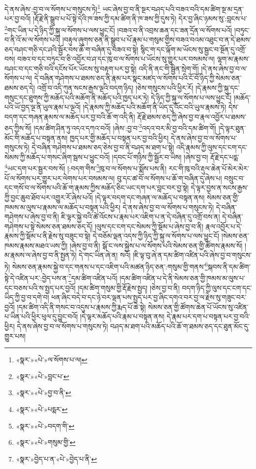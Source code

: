 དེ་ནས་ཞེས་:བྱ་བ་ལ་སོགས་པ་གསུངས་ཏེ།\footnote{«སྣར་»«པེ་»ལ་སོགས་པ་ལ།} ཡང་ཞེས་བྱ་བ་ནི་སྔར་བཤད་པའི་བཟའ་བའི་དམ་ཚིག་སྔ་མ་དྲན་པར་བྱ་བའོ། །རྡོ་རྗེ་ནི་སྒྲུབ་པ་པོ་སྟེ་དེའི་ཁ་ཟས་ཀྱི་དམ་ཚིག་ནི་ཁ་ཟས་ཀྱི་དུས་ཏེ། དེར་བྱ་ཞིང་ཉམས་སུ་:བླངས་པ་\footnote{«སྣར་»«པེ་»བླང་པ་}གང་ཡིན་པ་དེ་ཉིད་ཀྱི་སྐུ་ལ་སོགས་པ་ལས་ཕྱུང་ངོ། །བཟའ་བ་ནི་འབྲས་ཆན་དང་ཟན་དྲོན་ལ་སོགས་པའོ། །བཏུང་བ་ནི་འོ་མ་ལ་སོགས་པའོ། །བརྟུལ་ཞུགས་ཅན་ནི་སྒྲུབ་པ་པོ་རྣམ་པ་གསུམ་གྱིས་བཟའ་བའམ་འཐུང་བ་ན་དེ་ཐམས་ཅད་བཤང་གཅི་དང་ཤའི་སྦྱོར་བས་ཆོ་ག་བཞིན་དུ་བཟའ་བ་སྟེ། སྙིང་ག་དང་ལྐོག་མ་ཡོངས་སུ་སྦྱང་བ་སྔོན་དུ་འགྲོ་བས། བཟའ་བ་དང་བཏུང་བ་ཅི་འབྱོར་བ་ཤ་དང་ཁུ་བ་ལ་སོགས་པ་ཡོངས་སུ་གྱུར་པར་བསམས་ལ། ལྷག་མ་རྣམས་བཤང་བ་དང་གཅི་བའི་དངོས་པོར་ཡོངས་སུ་བརྟག་པར་བྱ་སྟེ། འདི་ནི་ནང་གི་སྦྱིན་སྲེག་གོ། །དེ་ནས་ཞེས་བྱ་བ་ལ་སོགས་པ་ལ། དེ་བཞིན་གཤེགས་པ་ཐམས་ཅད་ནི་རྣམ་པར་སྣང་མཛད་ལ་སོགས་པའི་ངོ་བོ་ཉིད་ཀྱི་སེམས་ཅན་ཐམས་ཅད་དེ། འགྲོ་བ་འདི་ཀུན་སངས་རྒྱས་ལྔའི་བདག་ཉིད། །ཅེས་གསུངས་པའི་ཕྱིར་རོ། །དེ་རྣམས་ཀྱི་སྐུ་དང་གསུང་དང་ཐུགས་ཀྱི་མཆོད་པའི་མཆོག་ནི་མཆོད་པའི་ཁྱད་པར་ཏེ། དེ་ཉིད་ཀྱི་སྐུ་ལ་སོགས་པ་ལས་ཕྱུང་ངོ། །མཆོད་པའི་ཡོ་བྱད་ལྔ་ནི་ཡུལ་རྣམ་པ་ལྔའོ། །དེ་རྣམས་ཀྱི་མཆོད་པའི་མཆོག་ནི་ཡིད་དུ་འོང་བའི་ཡུལ་རྣམས་ཏེ། དེས་བདག་དང་གཞན་རྣམས་ལ་མཆོད་པར་བྱ་བའི་ཆོ་ག་འདི་ནི། རྡོ་རྗེ་ཐམས་ཅད་ཀྱི་ཞེས་བྱ་བ་རྣལ་འབྱོར་པ་ཐམས་ཅད་ཀྱིས་སོ། །དམ་ཚིག་ཤིན་ཏུ་འདའ་དཀའ་བའོ། །ཞེས་:བྱ་བ་\footnote{«སྣར་»«པེ་»བྱ་བ་ནི་}འདའ་བར་མི་བྱ་བའི་དམ་ཚིག་གོ། །དེ་ལྟར་ཐུན་མོང་གི་མཆོད་པ་བསྟན་ནས། ཁྱད་པར་གྱི་མཆོད་པ་བསྟན་པར་བྱ་བའི་ཕྱིར། དེ་ནས་ཞེས་བྱ་བ་ལ་སོགས་པ་གསུངས་ཏེ། དེ་བཞིན་གཤེགས་པ་ཐམས་ཅད་ཅེས་བྱ་བ་ནི་བཤད་མ་ཐག་པ་སྟེ། འདི་རྣམས་ཀྱི་ལུས་དང་ངག་དང་སེམས་ཀྱི་མཆོད་པ་གསང་ཞིག་སྦས་པ་ཕྱུང་བའོ། །དབང་པོ་གཉིས་ཀྱི་སྦྱོར་བ་ཡིས། །ཞེས་བྱ་བ། རྡོ་རྗེ་དང་པདྨ་\footnote{«སྣར་»«པེ་»པདྨར་}ཡང་དག་པར་སྦྱར་བས་སོ། །:བདག་གིས་\footnote{«སྣར་»«པེ་»བདག་གི་}ཁུ་བ་ལ་སོགས་པ་སྨོས་པས་ནི། རང་གི་ཁུ་བའི་རྡུལ་ཆེན་པོ་མེར་མེར་པོ་ལ་སོགས་པར་གྱུར་པར་ལེགས་པར་བསམས་ལ། བུ་དང་ཚ་བོ་ལ་སོགས་པ་ཆོ་ག་བཞིན་དུ་ཞེས་པ། བསྲུང་བ་དང་གསོ་བ་ལ་སོགས་པའི་ཆོ་ག་རྣམས་ཀྱིས་མཆོད་ཅིང་ཡང་དག་པར་བླང་བར་བྱ་སྟེ། དེ་ལྟར་བྱས་ན་སངས་རྒྱས་ཀྱི་བྱང་ཆུབ་ཐོབ་པར་འགྱུར་རོ་ཞེས་པའོ། །དེ་ལྟར་བདག་དང་གཞན་ལ་མཆོད་པ་བསྟན་ནས། སེམས་ཅན་གྱི་ཁམས་མ་ལུས་པ་རྣམས་ལ་མཆོད་པ་བསྟན་པའི་ཕྱིར། དེ་ནས་ཞེས་བྱ་བ་ལ་སོགས་པ་གསུངས་ཏེ། དེ་བཞིན་གཤེགས་པ་ཞེས་བྱ་བ་ནི། ཇི་ལྟར་སྐྱེ་བའི་ཚེ་འོངས་པ་རྣམ་པར་འཇིག་པ་ན་དེ་བཞིན་དུ་འགྲོ་བས་ན། དེ་བཞིན་གཤེགས་པ་སྟེ་སེམས་ཅན་ཐམས་ཅད་དོ། །ལུས་དང་ངག་དང་སེམས་ཀྱི་སྡོམ་པ་ཞེས་བྱ་བ་ནི། རྣལ་འབྱོར་པ་དེ་རྣམས་ཀྱི་སྡོམ་པ་ནི་རྗེས་སུ་བཟུང་བ་སྟེ། དེ་བཅོམ་ལྡན་འདས་ཀྱི་ཉིད་ཀྱི་སྐུ་ལ་སོགས་པ་ལས་ཕྱུང་ངོ། །སེམས་ཅན་ཁམས་རྣམས་མཐའ་ཡས་ཀྱི། །ཞེས་བྱ་བ་ནི། སྒོ་ང་ལས་སྐྱེས་པ་ལ་སོགས་པའི་སེམས་ཅན་གྱི་ཚོགས་རྣམས་སོ། །མ་རྣམས་ལ་ཞེས་བྱ་བ་ནི་སྤྱན་ཏེ། དེ་གང་ཡིན་ཞེ་ན། སའོ། །ཇི་ལྟ་བུ་ཞེ་ན་དམ་ཚིག་འཛིན་པའི་ཞེས་བྱ་བ་གསུངས་ཏེ། སེམས་ཅན་རྣམས་སྐྱེ་བ་དང་གནས་པ་དང་འཇིག་པའི་མཚན་ཉིད་ཅན་:གསུམ་གྱི་གནས་\footnote{«སྣར་»«པེ་»གསུམ་གྱི་}སྐབས་ནི་དམ་ཚིག་སྟེ་དེ་འཛིན་པར་:བྱེད་པས་ན་\footnote{«སྣར་»བྱེད་པ་ན་«པེ་»བྱེད་པ་ནི་}དམ་ཚིག་འཛིན་པའོ། །དམ་ཚིག་འཛིན་པ་དེ་ནི་སེམས་ཅན་གྱི་ཁམས་མ་ལུས་པ་དང་བཅས་པའི་ས་སྤྱད་པར་བྱའོ། །དམ་ཚིག་གསུམ་གྱི་རྡོ་རྗེས་སྤྱད། །ཅེས་བྱ་བ་ནི། བདག་ཉིད་ཀྱི་ལུས་དང་ངག་དང་ཡིད་ཀྱི་བྱ་བ་དགེ་བ། ཕན་ཞིང་བདེ་བ་དང་ཉེ་བར་ལྡན་པས་སྤྱད་པར་བྱ་ཞིང་དགའ་བར་བྱ་ལ་རྗེས་སུ་གཟུང་བར་བྱའོ། །དམ་ཚིག་འདི་ནི་གསང་བ་འདུས་པ་རྣམས་ཀྱི་རྨད་པོ་ཆེ་སྟེ། སེམས་ཅན་གྱི་ཚོགས་ཆེན་པོ་ཡོངས་སུ་འཛིན་པ་ཡིན་པའི་ཕྱིར་ཕུལ་དུ་བྱུང་བའོ། །དེ་ལྟར་མཆོད་པའི་རྣམ་པ་བསྟན་ནས། དེ་རྣམ་པར་དག་པ་བསྟན་པར་བྱ་བའི་ཕྱིར། དེ་ནས་ཞེས་བྱ་བ་ལ་སོགས་པ་གསུངས་ཏེ། བཤད་མ་ཐག་པའི་མཆོད་པའི་ཆོ་ག་ཐམས་ཅད་དང་ཐུན་མོང་དུ་གྱུར་པས། 